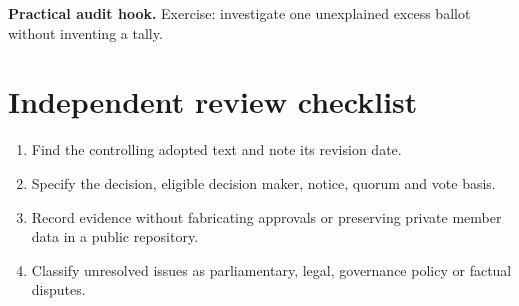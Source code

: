 \documentclass[11pt]{article}
\begin{document}
\textbf{Practical audit hook.} Exercise: investigate one unexplained excess ballot without inventing a tally.

\section{Independent review checklist}
\begin{enumerate}[leftmargin=*,itemsep=4pt]
\item Find the controlling adopted text and note its revision date.
\item Specify the decision, eligible decision maker, notice, quorum and vote basis.
\item Record evidence without fabricating approvals or preserving private member data in a public repository.
\item Classify unresolved issues as parliamentary, legal, governance policy or factual disputes.
\end{enumerate}
\end{document}
